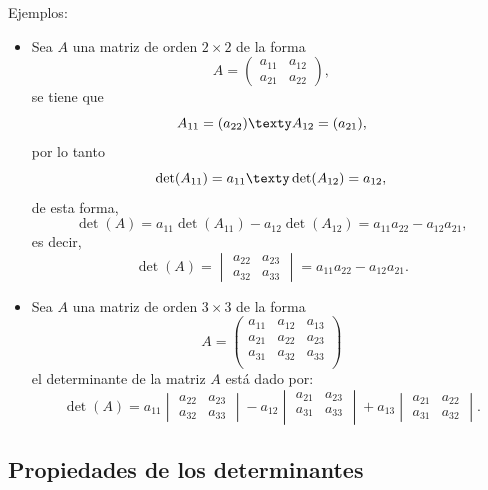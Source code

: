 \documentclass[a4,11pt]{aleph-notas}
\begin{document}
Ejemplos:
\begin{itemize}
\item 
    Sea $A$ una matriz de orden $2 \times 2$ de la forma
    \[ 
        A=
        \begin{pmatrix}
         a_{11} & a_{12}\\
         a_{21} & a_{22}
        \end{pmatrix},
    \]
    se tiene que
    \[
        A_{11} = (a_{22})
        \texty
        A_{12} = (a_{21}),
    \]
    por lo tanto
    \[
        \det(A_{11}) = a_{11}
        \texty
        \det(A_{12}) = a_{12},
    \]
    de esta forma,
    \[
        \det(A) = a_{11}\det(A_{11}) - a_{12}\det(A_{12})
            = a_{11}a_{22} - a_{12}a_{21},
    \]
    es decir,
    \[
        \det(A) = \begin{vmatrix}
        a_{22} & a_{23} \\
        a_{32} & a_{33}
        \end{vmatrix}
        = a_{11}a_{22} - a_{12}a_{21}.
    \]
\item Sea $A$ una matriz de orden $3 \times 3$ de la forma
         \[ A=
        \begin{pmatrix}
         a_{11} & a_{12} & a_{13}\\
         a_{21} & a_{22} & a_{23}\\
         a_{31} & a_{32} & a_{33}\\
        \end{pmatrix}
        \]
        \noindent el determinante de la matriz $A$ está dado por:
        \[
        \det(A) = a_{11}
        \begin{vmatrix}
        a_{22} & a_{23} \\
        a_{32} & a_{33}
        \end{vmatrix} - a_{12}
        \begin{vmatrix}
        a_{21} & a_{23} \\
        a_{31} & a_{33} \\
        \end{vmatrix}+ a_{13}
        \begin{vmatrix}
        a_{21} & a_{22} \\
        a_{31} & a_{32}
        \end{vmatrix}.
        \]
\end{itemize}

\subsection{Propiedades de los determinantes}
\end{document}
